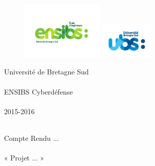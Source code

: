 \documentclass[11pt]{article}
\date{}                                           %
\begin{document}
\thispagestyle{empty}
\begin{figure}[!ht]
	\begin{minipage}{0.3\linewidth}
		\includegraphics[width=4cm]{images/logo-ensibs.pdf}
	\end{minipage}
	\begin{minipage}{0.7\linewidth}
		\raggedleft
		\includegraphics[height=1.8cm]{images/logo-ubs.jpg}
	\end{minipage}
\end{figure}

\begin{center}
{\Large Université de Bretagne Sud\\~\\
ENSIBS Cyberdéfense \\~\\
\Large 2015-2016\\~\\}
\end{center}

\vspace{2cm}

\begin{center}
{\huge Compte Rendu ... \\~\\
\huge « Projet ... »\\~\\}
\end{center}

\vspace{6cm}
\end{document}

